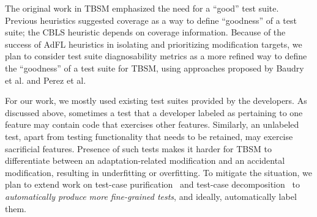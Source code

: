 The original work in TBSM emphasized the need for a ``good'' test suite. Previous heuristics suggested coverage as a way to define ``goodness'' of a test suite; the CBLS heuristic depends on coverage information. Because of the success of AdFL heuristics in isolating and prioritizing modification targets, we plan to consider test suite diagnosability metrics as a more refined way to define the ``goodness'' of a test suite for TBSM, using approaches proposed by Baudry et al. and Perez et al.~\cite{Baudry2006improving,perez2017diagnosibility}

For our work, we mostly used existing test suites provided by the developers. As discussed above, sometimes a test that a developer labeled as pertaining to one feature may contain code that exercises other features. Similarly, an unlabeled test, apart from testing functionality that needs to be retained, may exercise sacrificial features.  Presence of such tests makes it harder for TBSM to differentiate between an adaptation-related modification and an accidental modification, resulting in underfitting or overfitting. To mitigate the situation, we plan to extend work on test-case purification~\cite{xuan2014test}  and test-case decomposition~\cite{stvrcausereduce,christi18reduce} to \emph{automatically produce more fine-grained tests}, and ideally, automatically label them.
